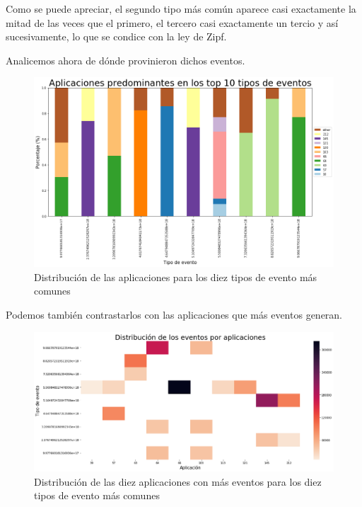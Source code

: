 \documentclass[a4paper, 12pt]{article}
\begin{document}
		Como se puede apreciar, el segundo tipo más común aparece casi exactamente la mitad de las veces que el primero, el tercero casi exactamente un tercio y así sucesivamente, lo que se condice con la ley de Zipf.
		
		Analicemos ahora de dónde provinieron dichos eventos.
		
		\FloatBarrier
		\begin{figure}[h]
			\centering
			\includegraphics[width=\textwidth]{images/events/appsxev.png}
			\caption{Distribución de las aplicaciones para los diez tipos de evento más comunes}
		\end{figure}
		\FloatBarrier
		
		Podemos también contrastarlos con las aplicaciones que más eventos generan.
		
		\FloatBarrier
		\begin{figure}[h]
			\centering
			\includegraphics[width=\textwidth]{images/events/top10appsevents.png}
			\caption{Distribución de las diez aplicaciones con más eventos para los diez tipos de evento más comunes}
		\end{figure}
		\FloatBarrier
		
\end{document}
